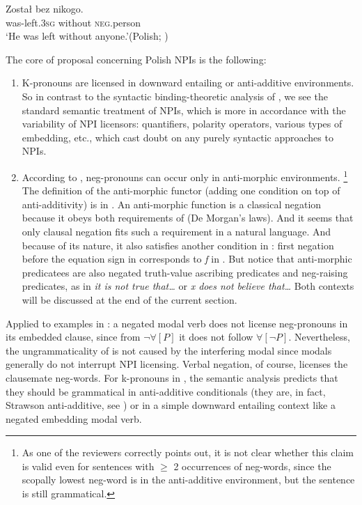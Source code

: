 \documentclass[output=paper,colorlinks,citecolor=brown]{langscibook}
\begin{document}
\ea\label{ex:30}\gll Został bez nikogo.\\
was-left.\textsc{3sg} without \textsc{neg}.person\\
\glt `He was left without anyone.'\hfill (Polish; \citealt{blaszczak2003negative})
\z

\noindent The core of  proposal concerning Polish NPIs is the following:

\begin{enumerate}
\item
  K-pronouns are licensed in downward entailing or anti-additive environments. So in contrast to the syntactic binding-theoretic analysis of \citet{Progovac1993a}, we see the standard semantic treatment of NPIs, which is more in accordance with the variability of NPI licensors: quantifiers, polarity operators, various types of embedding, etc., which cast doubt on any purely syntactic approaches to NPIs.
\item
  According to \citet{Blaszczak2001}, neg-pronouns can occur only in anti-morphic environments.%
  \footnote{As one of the reviewers correctly points out, it is not clear whether this claim is valid even for sentences with $\geq$ 2 occurrences of neg-words, since the scopally lowest neg-word is in the anti-additive environment, but the sentence is still grammatical.}
  The definition of the anti-morphic functor (adding one condition on top of anti-additivity) is in . An anti-morphic function is a classical negation because it obeys both requirements of  (De Morgan's laws). And it seems that only clausal negation fits such a requirement in a natural language. And because of its nature, it also satisfies another condition in : first negation before the equation sign in  corresponds to \emph{f} in . But notice that anti-morphic predicatees are also negated truth-value ascribing predicates and neg-raising predicates, as in \emph{it is not true that\ldots} or \emph{x does not believe that\ldots} Both contexts will be discussed at the end of the current section.
\end{enumerate}

\noindent Applied to examples in : a negated modal verb does not license neg-pronouns in its embedded clause, since from \(\neg \forall [P]\) it does not follow \(\forall [\neg P]\). Nevertheless, the ungrammaticality of  is not caused by the interfering modal since modals generally do not interrupt NPI licensing. Verbal negation, of course, licenses the clausemate neg-words. For k-pronouns in , the semantic analysis predicts that they should be grammatical in anti-additive conditionals (they are, in fact, Strawson anti-additive, see \citealt{gajewski2011licensing}) or in a simple downward entailing context like a negated embedding modal verb.
\end{document}
